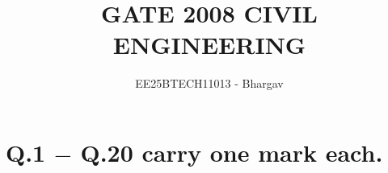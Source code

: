 \documentclass[journal]{IEEEtran}
\begin{document}

\vspace{3cm}


\title{GATE 2008 CIVIL ENGINEERING}
\author{EE25BTECH11013 - Bhargav}
\maketitle
{\let\newpage\relax\maketitle}

\renewcommand{\thefigure}{\theenumi}
\renewcommand{\thetable}{\theenumi}
\setlength{\intextsep}{10pt} %


\section*{Q.1 $-$ Q.20 carry one mark each.}
\end{document}
